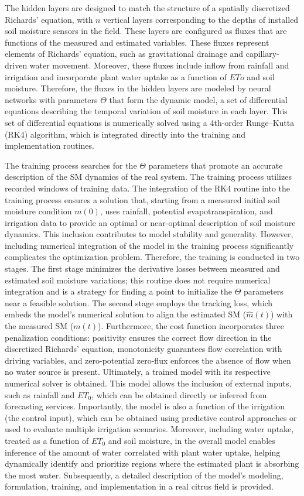 \documentclass[pdflatex,sn-nature]{sn-jnl}%
\theoremstyle{thmstyleone}%
\theoremstyle{thmstyletwo}%
\theoremstyle{thmstylethree}%
\begin{document}
The hidden layers are designed to match the structure of a spatially discretized Richards' equation, with $n$ vertical layers corresponding to the depths of installed soil moisture sensors in the field. These layers are configured as fluxes that are functions of the measured and estimated variables. These fluxes represent elements of Richards' equation, such as gravitational drainage and capillary-driven water movement. Moreover, these fluxes include inflow from rainfall and irrigation and incorporate plant water uptake as a function of $ETo$ and soil moisture. Therefore, the fluxes in the hidden layers are modeled by neural networks with parameters $\Theta$ that form the dynamic model, a set of differential equations describing the temporal variation of soil moisture in each layer. This set of differential equations is numerically solved using a 4th-order Runge–Kutta (RK4) algorithm, which is integrated directly into the training and implementation routines.

The training process searches for the $\Theta$ parameters that promote an accurate description of the SM dynamics of the real system. The training process utilizes recorded windows of training data. The integration of the RK4 routine into the training process ensures a solution that, starting from a measured initial soil moisture condition $m(0)$, uses rainfall, potential evapotranspiration, and irrigation data to provide an optimal or near-optimal description of soil moisture dynamics. This inclusion contributes to model stability and generality. However, including numerical integration of the model in the training process significantly complicates the optimization problem. Therefore, the training is conducted in two stages. The first stage minimizes the derivative losses between measured and estimated soil moisture variations; this routine does not require numerical integration and is a strategy for finding a point to initialize the $\Theta$ parameters near a feasible solution. The second stage employs the tracking loss, which embeds the model's numerical solution to align the estimated SM ($\hat{m}(t)$) with the measured SM ($m(t)$).
Furthermore, the cost function incorporates three penalization conditions: positivity ensures the correct flow direction in the discretized Richards' equation, monotonicity guarantees flow correlation with driving variables, and zero-potential zero-flux enforces the absence of flow when no water source is present.
Ultimately, a trained model with its respective numerical solver is obtained. This model allows the inclusion of external inputs, such as rainfall and $ET_0$, which can be obtained directly or inferred from forecasting services. Importantly, the model is also a function of the irrigation (the control input), which can be obtained using predictive control approaches or used to evaluate multiple irrigation scenarios. Moreover, including water uptake, treated as a function of $ET_0$ and soil moisture, in the overall model enables inference of the amount of water correlated with plant water uptake, helping dynamically identify and prioritize regions where the estimated plant is absorbing the most water.
Subsequently, a detailed description of the model's modeling, formulation, training, and implementation in a real citrus field is provided.
\end{document}

